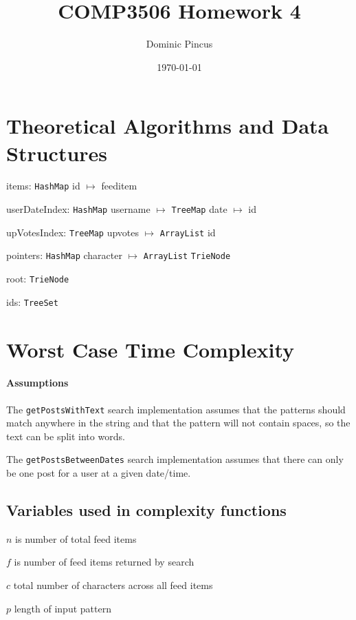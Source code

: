 \documentclass[11pt, oneside]{article}   	%
\title{COMP3506 Homework 4}
\author{Dominic Pincus}
\date{\today}
\begin{document}
\maketitle

\section{Theoretical Algorithms and Data Structures}

\begin{description}

\item items: \texttt{HashMap} id $\mapsto$ feeditem 
\item userDateIndex: \texttt{HashMap} username $\mapsto$ \texttt{TreeMap} date $\mapsto$ id 
\item upVotesIndex: \texttt{TreeMap} upvotes $\mapsto$ \texttt{ArrayList} id 
\item pointers: \texttt{HashMap} character $\mapsto$ \texttt{ArrayList} \texttt{TrieNode} 
\item root: \texttt{TrieNode} 
\item ids: \texttt{TreeSet} 

\end{description}

\section{Worst Case Time Complexity}

\paragraph{Assumptions}

The \texttt{getPostsWithText} search implementation assumes that the patterns should match anywhere in the string and that the pattern will not contain spaces, so the text can be split into words.

The \texttt{getPostsBetweenDates} search implementation assumes that there can only be one post for a user at a given date/time.

\subsection{Variables used in complexity functions}

\begin{description}

\item $n$ is number of total feed items
\item $f$ is number of feed items returned by search
\item $c$ total number of characters across all feed items
\item $p$ length of input pattern

\end{description}
\end{document}
